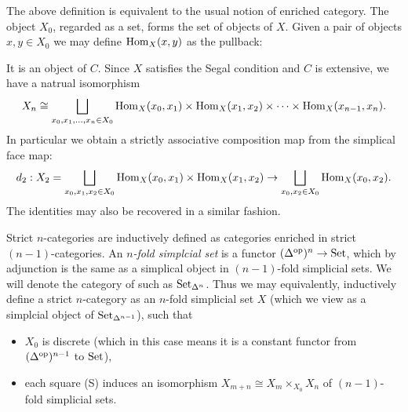 \documentclass[a4paper]{amsart}
\begin{document}
The above definition is equivalent to the usual notion of enriched category. The object $X_0$, regarded as a set, forms the set of objects of $X$. Given a pair of objects $x,y \in X_0$ we may define $\operatorname{Hom}_X(x,y)$ as the pullback:
\begin{center}
\end{center}
It is an object of $C$. Since $X$ satisfies the Segal condition and $C$ is extensive, we have a natrual isomorphism
\begin{equation*}
	X_n \cong \bigsqcup_{x_0, x_1, \dots, x_n \in X_0} \operatorname{Hom}_X(x_0, x_1) \times \operatorname{Hom}_X(x_1, x_2) \times \cdots \times \operatorname{Hom}_X(x_{n-1}, x_n).
\end{equation*}
In particular we obtain a strictly associative composition map from the simplical face map:
\begin{equation*}
	d_2: X_2 = \bigsqcup_{x_0, x_1, x_2 \in X_0} \operatorname{Hom}_X(x_0, x_1) \times \operatorname{Hom}_X(x_1, x_2) \to \bigsqcup_{x_0, x_2 \in X_0} \operatorname{Hom}_X(x_0, x_2).
\end{equation*}
The identities may also be recovered in a similar fashion. 

Strict $n$-categories are inductively defined as categories enriched in strict $(n-1)$-categories. 
An {\em $n$-fold simplcial set} is a functor $(\Delta^{\mathrm{op}})^n \to \mathrm{Set}$, which by adjunction is the same as a simplical object in $(n-1)$-fold simplicial sets. We will denote the category of such as $\mathrm{Set}_{\Delta^n}$. Thus we may equivalently, inductively define a strict $n$-category as an $n$-fold simplicial set $X$ (which we view as a simplcial object of $\mathrm{Set}_{\Delta^{n-1}}$), such that
\begin{itemize}
	\item $X_0$ is discrete (which in this case means it is a constant functor from $(\Delta^{\mathrm{op}})^{n-1}$ to $\mathrm{Set}$),
	\item each square (S) induces an isomorphism 
	$X_{m+n} \cong X_m \times_{X_0} X_n$ of $(n-1)$-fold simplicial sets.
\end{itemize}
\end{document}
